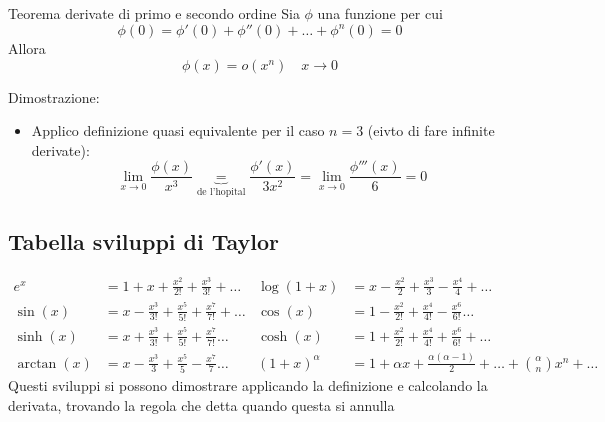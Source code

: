 \begin{teorema}{Teorema derivate di primo e secondo ordine}
	Sia $\phi $ una funzione per cui
	\[
		\phi \left( 0 \right) = \phi ' \left( 0 \right) + \phi ''\left( 0 \right) +\ldots + \phi ^{n}\left( 0 \right) =0
	\]
	Allora
	\[
		\phi \left( x \right)  = o \left( x^{n} \right) \quad x \to 0
	\]
\end{teorema}

Dimostrazione:
\begin{itemize}
	\item Applico definizione quasi equivalente per il caso $n=3$ (eivto di fare infinite derivate):
	      \[
		      \lim_{x \to 0} \frac{\phi \left( x \right) }{x^3} \underbrace{=}_{\text{de l'hopital}} \frac{\phi ' \left( x \right)}{3x^2} = \lim_{x \to 0} \frac{\phi ''' \left( x \right) }{6} = 0
	      \]
\end{itemize}
\subsection{Tabella sviluppi di Taylor}
\begin{align*}
	e^{x}                    & =  1 + x + \frac{x^2}{2!} + \frac{x^{3}}{3!} + \ldots              & \log \left( 1+x \right)       & = x - \frac{x^2}{2}+ \frac{x^3}{3}- \frac{x^{4}}{4} + \ldots                                              \\
	\sin \left( x \right)    & =  x - \frac{x^3}{3!} + \frac{x^{5}}{5!}+ \frac{x^{7}}{7!}+ \ldots & \cos \left( x \right)         & =  1- \frac{x^2}{2!} + \frac{x^{4}}{4!} - \frac{x^{6}}{6!} \ldots                                         \\
	\sinh \left( x \right)   & =  x + \frac{x^3}{3!} + \frac{x^{5}}{5!} + \frac{x^{7}}{7!} \ldots & \cosh \left( x \right)        & =  1 + \frac{x^2}{2!} + \frac{x^{4}}{4!} + \frac{x^{6}}{6!} + \ldots                                      \\
	\arctan \left( x \right) & =  x - \frac{x^3}{3} + \frac{x^{5}}{5} - \frac{x^{7}}{7} \ldots    & \left( 1+x \right) ^{\alpha } & = 1 + \alpha  x + \frac{\alpha  \left( \alpha  -1 \right) }{2}+ \ldots + \binom{\alpha }{n}x^{n} + \ldots
\end{align*}
\hr
Questi sviluppi si possono dimostrare applicando la definizione e calcolando la derivata, trovando la regola che detta quando questa si annulla

